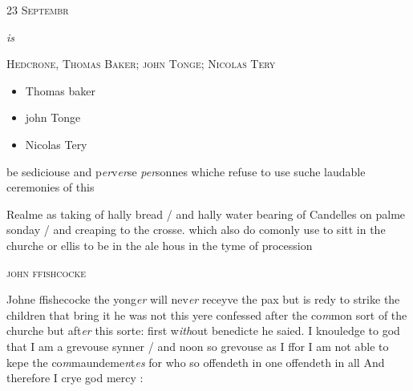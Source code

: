 \documentclass[12pt, a4paper]{book}
\begin{document}
            
            
               
				\begin{center} \begin{large} {\scshape 
                  23 Septembr
               } \end{large} \end{center}
			
               \textit{is}
               
               	
				\begin{center}  {\scshape Hedcrone, Thomas Baker; john Tonge; Nicolas Tery}  \end{center}
			
               	
               		\begin{itemize}
               			\item[]Thomas baker
               			\item[]john Tonge
               			\item[]Nicolas Tery
               		\end{itemize}
               		
		\ifthenelse{\isodd{\thepage}}
		{\reversemarginpar}
		{\normalmarginpar}
		be sediciouse and p\textit{er}v\textit{er}se \textit{per}sonnes whiche refuse to use suche laudable ceremonies of this
               	
 
		\ifthenelse{\isodd{\thepage}}
		{\reversemarginpar}
		{\normalmarginpar}
		Realme as taking of hally bread / and hally water
 bearing of Candelles on palme sonday / and
 creaping to the crosse. which also do comonly use
 to sitt in the churche or ellis to be in the ale hous
 in the tyme of procession
 

               
               	
				\begin{center}  {\scshape john ffishcocke}  \end{center}
			
               	
               		
		\ifthenelse{\isodd{\thepage}}
		{\reversemarginpar}
		{\normalmarginpar}
		Johne ffishecocke the yong\textit{er} will nev\textit{er} receyve the pax
 but is redy to strike the children that bring it
 he was not this yere confessed after the co\textit{m}mon sort
 of the churche but aft\textit{er} this sorte: first w\textit{ith}out
 benedicte he saied. I knouledge to god that I
 am a grevouse synner / and noon so grevouse as I
 ffor I am not able to kepe the co\textit{m}maundeme\textit{n}t\textit{es}
 for who so offendeth in one offendeth in all
 And therefore I crye god mercy :
\end{document}
